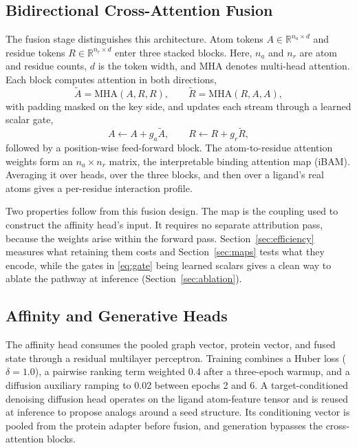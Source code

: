 \documentclass{ieeeaccess}
\begin{document}
\subsection{Bidirectional Cross-Attention Fusion}
The fusion stage distinguishes this architecture. Atom tokens
$A \in \mathbb{R}^{n_a \times d}$ and residue tokens
$R \in \mathbb{R}^{n_r \times d}$ enter three stacked blocks. Here, $n_a$ and
$n_r$ are atom and residue counts, $d$ is the token width, and MHA denotes
multi-head attention. Each block computes attention in both directions,
\begin{equation}
\tilde{A} = \mathrm{MHA}(A, R, R), \qquad
\tilde{R} = \mathrm{MHA}(R, A, A),
\end{equation}
with padding masked on the key side, and updates each stream through a learned
scalar gate,
\begin{equation}
A \leftarrow A + g_a \tilde{A}, \qquad
R \leftarrow R + g_r \tilde{R},
\label{eq:gate}
\end{equation}
followed by a position-wise feed-forward block. The atom-to-residue attention
weights form an $n_a \times n_r$ matrix, the interpretable binding attention map
(iBAM). Averaging it over heads, over the three blocks, and then over a ligand's
real atoms gives a per-residue interaction profile.

Two properties follow from this fusion design. The
map is the coupling used to construct the affinity head's input. It requires
no separate attribution pass, because the weights arise within the forward
pass. Section~\ref{sec:efficiency} measures
what retaining them costs and Section~\ref{sec:maps} tests what they encode,
while the gates in \eqref{eq:gate} being learned scalars gives a clean way to
ablate the pathway at inference (Section~\ref{sec:ablation}).

\subsection{Affinity and Generative Heads}
The affinity head consumes the pooled graph vector, protein vector, and fused
state through a residual multilayer perceptron. Training combines a Huber loss
($\delta = 1.0$), a pairwise ranking term weighted 0.4 after a three-epoch
warmup, and a diffusion auxiliary ramping to 0.02 between epochs 2 and 6. A
target-conditioned denoising diffusion head \cite{ho2020ddpm} operates on the
ligand atom-feature tensor and is reused at inference to propose analogs around
a seed structure. Its conditioning vector is pooled from the protein adapter
before fusion, and generation bypasses the cross-attention blocks.
\end{document}
